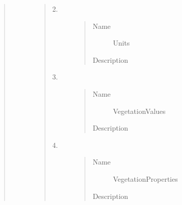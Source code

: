 \documentclass[letterpaper,10pt,english]{sphinxmanual}
\begin{document}
\begin{quote}
\begin{description}
\begin{quote}
\begin{description}
\begin{quote}
\begin{description}
\end{description}\end{quote}

\item[{2.}] \leavevmode\begin{quote}\begin{description}
\item[{Name}] \leavevmode
Units

\item[{Description}] \leavevmode
{}

\end{description}\end{quote}

\item[{3.}] \leavevmode\begin{quote}\begin{description}
\item[{Name}] \leavevmode
VegetationValues

\item[{Description}] \leavevmode
{}

\end{description}\end{quote}

\item[{4.}] \leavevmode\begin{quote}\begin{description}
\item[{Name}] \leavevmode
VegetationProperties

\item[{Description}] \leavevmode
{}

\end{description}\end{quote}

\end{description}\end{quote}

\end{description}\end{quote}
\end{document}
